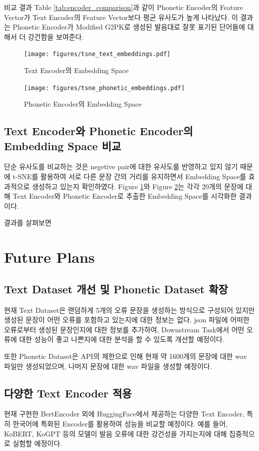 \documentclass[letterpaper]{article} %
\begin{document}
비교 결과 Table \ref{tab:encoder_comparison}과 같이 Phonetic Encoder의 Feature Vector가 Text Encoder의 Feature Vector보다 평균 유사도가 높게 나타났다. 이 결과는 Phonetic Encoder가 Modified G2PK로 생성된 발음대로 잘못 표기된 단어들에 대해서 더 강건함을 보여준다.

\begin{figure}[ht]
    \centering
    \texttt{[image: figures/tsne\_text\_embeddings.pdf]}
    \caption{Text Encoder의 Embedding Space}
    \label{fig:tsne_text_encoder}
\end{figure}

\begin{figure}[ht]
    \centering
    \texttt{[image: figures/tsne\_phonetic\_embeddings.pdf]}
    \caption{Phonetic Encoder의 Embedding Space}
    \label{fig:tsne_phonetic_encoder}
\end{figure}

\subsection{Text Encoder와 Phonetic Encoder의 Embedding Space 비교}
단순 유사도를 비교하는 것은 negetive pair에 대한 유사도를 반영하고 있지 않기 때문에 t-SNE를 활용하여 서로 다른 문장 간의 거리를 유지하면서 Embedding Space를 효과적으로 생성하고 있는지 확인하였다. 
Figure \ref{fig:tsne_text_encoder}와 Figure \ref{fig:tsne_phonetic_encoder}는 각각 20개의 문장에 대해 Text Encoder와 Phonetic Encoder로 추출한 Embedding Space를 시각화한 결과이다.

결과를 살펴보면 

\section{Future Plans}
\subsection{Text Dataset 개선 및 Phonetic Dataset 확장}
현재 Text Dataset은 랜덤하게 5개의 오류 문장을 생성하는 방식으로 구성되어 있지만 생성된 문장이 어떤 오류를 포함하고 있는지에 대한 정보는 없다. 
json 파일에 어떠한 오류로부터 생성된 문장인지에 대한 정보를 추가하여, Downstream Task에서 어떤 오류에 대한 성능이 좋고 나쁜지에 대한 분석을 할 수 있도록 개선할 예정이다.

또한 Phonetic Dataset은 API의 제한으로 인해 현재 약 1600개의 문장에 대한 wav 파일만 생성되었으며, 나머지 문장에 대한 wav 파일을 생성할 예정이다.

\subsection{다양한 Text Encoder 적용}
현재 구현한 BertEncoder 외에 HuggingFace에서 제공하는 다양한 Text Encoder, 특히 한국어에 특화된 Encoder를 활용하여 성능을 비교할 예정이다. 
예를 들어, KoBERT, KoGPT 등의 모델이 발음 오류에 대한 강건성을 가지는지에 대해 집중적으로 실험할 예정이다.
\end{document}
